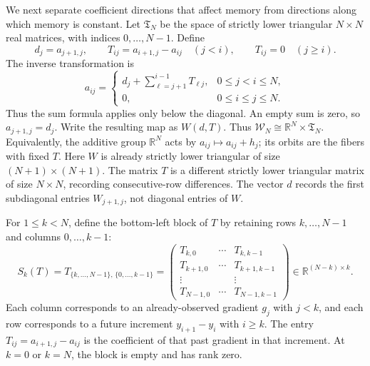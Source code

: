 \documentclass[11pt]{article}
\numberwithin{equation}{section}
\theoremstyle{definition}
\newcommand{\R}{\mathbb R}
\newcommand{\W}{\mathcal W_N}
\begin{document}
We next separate coefficient directions that affect memory from directions along which memory is constant. Let $\mathfrak T_N$ be the space of strictly lower triangular $N\times N$ real matrices, with indices $0,\ldots,N-1$. Define
\begin{equation}
 d_j=a_{j+1,j},\qquad
 T_{ij}=a_{i+1,j}-a_{ij}\quad(j<i),\qquad T_{ij}=0\quad(j\ge i).
 \label{eq:coordinates}
\end{equation}
The inverse transformation is
\begin{equation}
 a_{ij}=
 \begin{cases}
 d_j+\displaystyle\sum_{\ell=j+1}^{i-1}T_{\ell j},
       &0\le j<i\le N,\\[3pt]
 0,    &0\le i\le j\le N.
 \end{cases}
 \label{eq:inverse}
\end{equation}
Thus the sum formula applies only below the diagonal. An empty sum is zero, so $a_{j+1,j}=d_j$.
Write the resulting map as $W(d,T)$. Thus $\W\cong\R^N\times\mathfrak T_N$. Equivalently, the additive group $\R^N$ acts by $a_{ij}\mapsto a_{ij}+h_j$; its orbits are the fibers with fixed $T$.
Here $W$ is already strictly lower triangular of size $(N+1)\times(N+1)$. The matrix $T$ is a different strictly lower triangular matrix of size $N\times N$, recording consecutive-row differences. The vector $d$ records the first subdiagonal entries $W_{j+1,j}$, not diagonal entries of $W$.

For $1\le k<N$, define the bottom-left block of $T$ by retaining rows $k,\ldots,N-1$ and columns $0,\ldots,k-1$:
\[
 S_k(T)=T_{\{k,\ldots,N-1\},\,\{0,\ldots,k-1\}}
 =
 \begin{pmatrix}
 T_{k,0}&\cdots&T_{k,k-1}\\
 T_{k+1,0}&\cdots&T_{k+1,k-1}\\
 \vdots&&\vdots\\
 T_{N-1,0}&\cdots&T_{N-1,k-1}
 \end{pmatrix}
 \in\R^{(N-k)\times k}.
\]
Each column corresponds to an already-observed gradient $g_j$ with $j<k$, and each row corresponds to a future increment $y_{i+1}-y_i$ with $i\ge k$. The entry $T_{ij}=a_{i+1,j}-a_{ij}$ is the coefficient of that past gradient in that increment. At $k=0$ or $k=N$, the block is empty and has rank zero.
\end{document}
